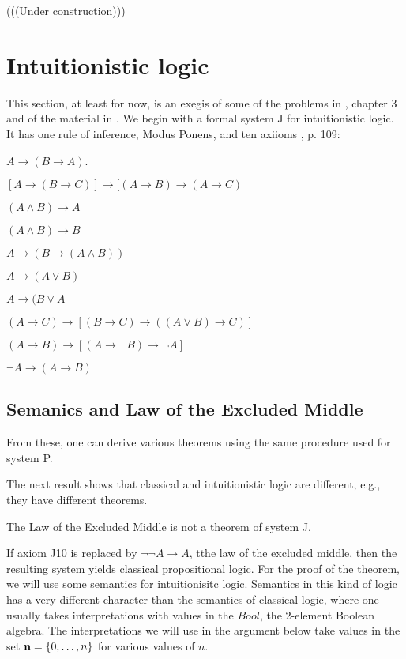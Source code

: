 \begin{mathmacro}
\newcommand{\set}[1]{\{ #1 \}}
\newcommand{\opensets}[0]{\mathcal{O}}
\newcommand{\for}[0]{\mathcal{F}}
\newcommand{\axioms}[0]{\mathcal{A}}
\newcommand{\theorems}[0]{\mathcal{T}}
\end{mathmacro}

(((Under construction)))


\section{Intuitionistic logic}

\innertableofcontents

This section, at least for now, is an exegis of some of the problems in \cite{RH}, chapter 3 and of the material in \cite{WKIL}.  We begin with a formal system J for intuitionistic logic. It has one rule of inference, Modus Ponens, and ten axiioms \cite{RH}, p. 109:

 $A \to (B \to A)$.

 $[A \to (B \to C)] \to [(A \to B) \to (A \to C) $

 $(A \land B) \to A$

 $(A \land B) \to B$

 $A \to (B \to (A \land B)) $

 $A \to (A \lor B)$

 $A \to (B \lor A$

 $(A \to C) \to [(B \to C) \to ((A \lor B) \to C)] $

 $(A \to B) \to [(A \to \neg B) \to \neg A ] $

 $\neg A \to (A \to B) $

\subsection{Semanics and Law of the Excluded Middle}

From these, one can derive various theorems using the same procedure used for system P.

The next result shows that classical  and intuitionistic logic are different, e.g., they have different theorems.

\begin{theorem}  \label{lem} The Law of the Excluded Middle is not a theorem of system J.
\end{theorem}


If axiom J10 is replaced by $\neg \neg A \to A$, tthe law of the excluded middle, then the resulting system yields classical propositional logic.
For the proof of the theorem, we will use some semantics for intuitionisitc logic.  Semantics in this kind of logic has a very different character than the semantics of classical logic, where one usually takes interpretations with values in the $Bool$, the 2-element Boolean algebra.  The interpretations we will use in the argument below take values in the set  $\mathbf{n} = \set{0, \ldots, n}$ for various values of $n$. 

